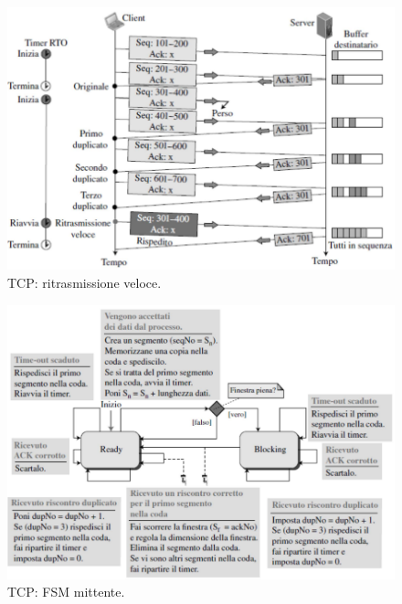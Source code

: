 \documentclass[11pt, italian, openany]{book}
\begin{document}
\begin{sloppypar}
\begin{figure}[!h]
	\centering
	\includegraphics[scale=0.55]{images/tcp-ritrasmissione-veloce.png}
	\caption{TCP: ritrasmissione veloce.}
	\label{fig:tcp-ritrasmissione-veloce}
\end{figure}

\pagebreak

\begin{figure}[!h]
	\centering
	\includegraphics[scale=0.45]{images/tcp-fsm-mittente.png}
	\caption{TCP: FSM mittente.}
	\label{fig:tcp-fsm-mittente}
\end{figure}


\end{sloppypar}
\end{document}
